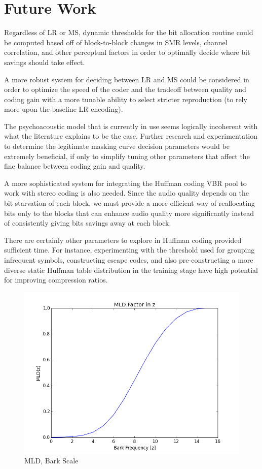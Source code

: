 \documentclass{vldb}
\begin{document}
\section{Future Work}
Regardless of LR or MS, dynamic thresholds for the bit allocation routine could be computed based off of block-to-block changes in SMR levels, channel correlation, and other perceptual factors in order to optimally decide where bit savings should take effect.

A more robust system for deciding between LR and MS could be considered in order to optimize the speed of the coder and the tradeoff between quality and coding gain with a more tunable ability to select stricter reproduction (to rely more upon the baseline LR encoding).

The psychoacoustic model that is currently in use seems logically incoherent with what the literature explains to be the case. Further research and experimentation to determine the legitimate masking curve decision parameters would be extremely beneficial, if only to simplify tuning other parameters that affect the fine balance between coding gain and quality.

A more sophisticated system for integrating the Huffman coding VBR pool to work with stereo coding is also needed. Since the audio quality depends on the bit starvation of each block, we must provide a more efficient way of reallocating bits only to the blocks that can enhance audio quality more significantly instead of consistently giving bits savings away at each block. 

There are certainly other parameters to explore in Huffman coding provided sufficient time. For instance, experimenting with the threshold used for grouping infrequent symbols, constructing escape codes, and also pre-constructing a more diverse static Huffman table distribution in the training stage have high potential for improving compression ratios.    

\begin{figure}[ht] 
\centering
\includegraphics[width=3.5 in]{mld_z}
\caption{MLD, Bark Scale}
\label{fig:mldz}
\end{figure}




\end{document}
